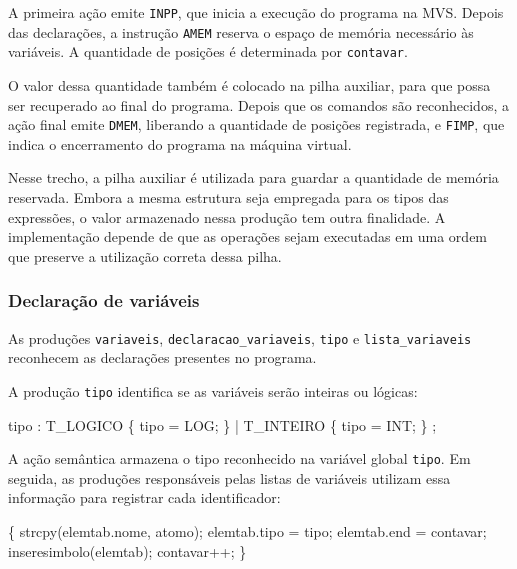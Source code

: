 \documentclass[
  brazilian,
  letterpaper,
]{book}
\newenvironment{Shaded}{\begin{snugshade}}{\end{snugshade}}
\newcommand{\NormalTok}[1]{\textcolor[rgb]{0.00,0.23,0.31}{#1}}
\newcommand{\OperatorTok}[1]{\textcolor[rgb]{0.37,0.37,0.37}{#1}}
\theoremstyle{plain}
\theoremstyle{definition}
\theoremstyle{remark}
\begin{document}
A primeira ação emite \texttt{INPP}, que inicia a execução do programa
na MVS. Depois das declarações, a instrução \texttt{AMEM} reserva o
espaço de memória necessário às variáveis. A quantidade de posições é
determinada por \texttt{contavar}.

O valor dessa quantidade também é colocado na pilha auxiliar, para que
possa ser recuperado ao final do programa. Depois que os comandos são
reconhecidos, a ação final emite \texttt{DMEM}, liberando a quantidade
de posições registrada, e \texttt{FIMP}, que indica o encerramento do
programa na máquina virtual.

Nesse trecho, a pilha auxiliar é utilizada para guardar a quantidade de
memória reservada. Embora a mesma estrutura seja empregada para os tipos
das expressões, o valor armazenado nessa produção tem outra finalidade.
A implementação depende de que as operações sejam executadas em uma
ordem que preserve a utilização correta dessa pilha.

\subsubsection{Declaração de
variáveis}\label{declarauxe7uxe3o-de-variuxe1veis}

As produções \texttt{variaveis}, \texttt{declaracao\_variaveis},
\texttt{tipo} e \texttt{lista\_variaveis} reconhecem as declarações
presentes no programa.

A produção \texttt{tipo} identifica se as variáveis serão inteiras ou
lógicas:

\begin{Shaded}
\begin{Highlighting}[]
\NormalTok{tipo}
    \OperatorTok{:}\NormalTok{ T\_LOGICO}
        \OperatorTok{\{}\NormalTok{ tipo }\OperatorTok{=}\NormalTok{ LOG}\OperatorTok{;} \OperatorTok{\}}
    \OperatorTok{|}\NormalTok{ T\_INTEIRO}
        \OperatorTok{\{}\NormalTok{ tipo }\OperatorTok{=}\NormalTok{ INT}\OperatorTok{;} \OperatorTok{\}}
    \OperatorTok{;}
\end{Highlighting}
\end{Shaded}

A ação semântica armazena o tipo reconhecido na variável global
\texttt{tipo}. Em seguida, as produções responsáveis pelas listas de
variáveis utilizam essa informação para registrar cada identificador:

\begin{Shaded}
\begin{Highlighting}[]
      \OperatorTok{\{} 
\NormalTok{        strcpy}\OperatorTok{(}\NormalTok{elemtab}\OperatorTok{.}\NormalTok{nome}\OperatorTok{,}\NormalTok{ atomo}\OperatorTok{);}
\NormalTok{        elemtab}\OperatorTok{.}\NormalTok{tipo }\OperatorTok{=}\NormalTok{ tipo}\OperatorTok{;}
\NormalTok{        elemtab}\OperatorTok{.}\NormalTok{end }\OperatorTok{=}\NormalTok{ contavar}\OperatorTok{;}
\NormalTok{        inseresimbolo}\OperatorTok{(}\NormalTok{elemtab}\OperatorTok{);}
\NormalTok{        contavar}\OperatorTok{++;} 
      \OperatorTok{\}}
\end{Highlighting}
\end{Shaded}
\end{document}
